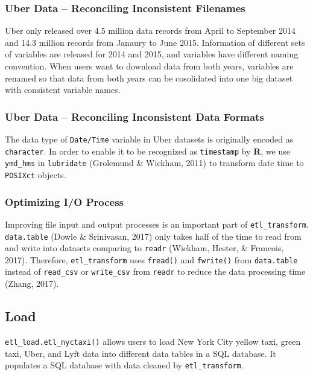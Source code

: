 \documentclass[12pt,twoside]{reedthesis}
\newenvironment{Shaded}{\begin{snugshade}}{\end{snugshade}}
\newcommand{\KeywordTok}[1]{\textcolor[rgb]{0.13,0.29,0.53}{\textbf{#1}}}
\newcommand{\DataTypeTok}[1]{\textcolor[rgb]{0.13,0.29,0.53}{#1}}
\newcommand{\DecValTok}[1]{\textcolor[rgb]{0.00,0.00,0.81}{#1}}
\newcommand{\StringTok}[1]{\textcolor[rgb]{0.31,0.60,0.02}{#1}}
\newcommand{\OperatorTok}[1]{\textcolor[rgb]{0.81,0.36,0.00}{\textbf{#1}}}
\newcommand{\NormalTok}[1]{#1}
\theoremstyle{definition}
\theoremstyle{definition}
\theoremstyle{definition}
\theoremstyle{remark}
\begin{document}
\subsubsection{Uber Data -- Reconciling Inconsistent
Filenames}\label{uber-data-reconciling-inconsistent-filenames}

Uber only released over 4.5 million data records from April to September
2014 and 14.3 million records from Janaury to June 2015. Information of
different sets of variables are released for 2014 and 2015, and
variables have different naming convention. When users want to download
data from both years, variables are renamed so that data from both years
can be cosolidated into one big dataset with consistent variable names.

\subsubsection{Uber Data -- Reconciling Inconsistent Data
Formats}\label{uber-data-reconciling-inconsistent-data-formats}

The data type of \texttt{Date/Time} variable in Uber datasets is
originally encoded as \texttt{character}. In order to enable it to be
recognized as \texttt{timestamp} by \textbf{R}, we use \texttt{ymd\_hms}
in \texttt{lubridate} (Grolemund \& Wickham, 2011) to transform date
time to \texttt{POSIXct} objects.

\subsubsection{Optimizing I/O Process}\label{optimizing-io-process}

Improving file input and output processes is an important part of
\texttt{etl\_transform}. \texttt{data.table} (Dowle \& Srinivasan, 2017)
only takes half of the time to read from and write into datasets
comparing to \texttt{readr} (Wickham, Hester, \& Francois, 2017).
Therefore, \texttt{etl\_transform} uses \texttt{fread()} and
\texttt{fwrite()} from \texttt{data.table} instead of \texttt{read\_csv}
or \texttt{write\_csv} from \texttt{readr} to reduce the data processing
time (Zhang, 2017).

\subsection{Load}\label{load}

\texttt{etl\_load.etl\_nyctaxi()} allows users to load New York City
yellow taxi, green taxi, Uber, and Lyft data into different data tables
in a SQL database. It populates a SQL database with data cleaned by
\texttt{etl\_transform}.
\begin{Shaded}
\end{Shaded}
\end{document}

